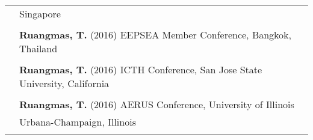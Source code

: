 \documentclass[letterpaper,11pt,oneside]{article}\usepackage[]{graphicx}\usepackage[]{xcolor}
\begin{document}
\begin{tabular}{p{1.2in} l}
                        & Singapore \\
                        & \\
                        & \textbf{Ruangmas, T.} (2016) EEPSEA Member Conference, Bangkok, Thailand \\
                        & \\
                        & \textbf{Ruangmas, T.} (2016) ICTH Conference, San Jose State University, California \\
                        & \\
                        & \textbf{Ruangmas, T.} (2016) AERUS Conference, University of Illinois \\
                        & Urbana-Champaign, Illinois \\
                        & \\
\end{tabular}
\end{document}
